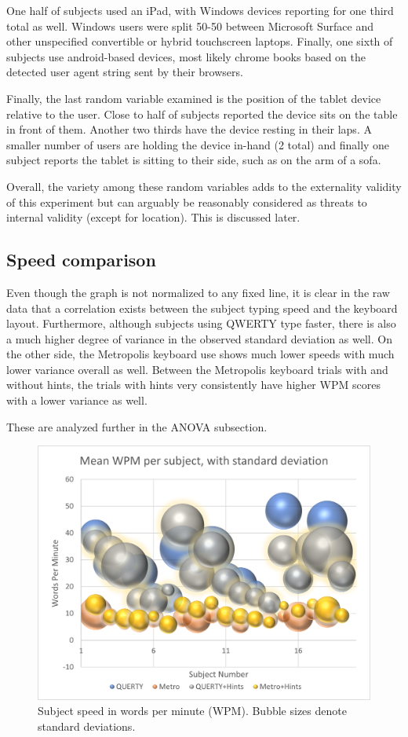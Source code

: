 \documentclass[english]{vgtc}
\begin{document}
One half of subjects used an iPad, with Windows devices reporting for one third total as well.
Windows users were split 50-50 between Microsoft Surface and other unspecified convertible or hybrid touchscreen
laptops.  Finally, one sixth of subjects use android-based devices, most likely chrome books based on the detected
user agent string sent by their browsers.

Finally, the last random variable examined is the position of the tablet device relative to the user. Close to half
of subjects reported the device sits on the table in front of them.  Another two thirds have the device resting in
their laps.  A smaller number of users are holding the device in-hand (2 total) and finally one subject reports the
tablet is sitting to their side, such as on the arm of a sofa.

Overall, the variety among these random variables adds to the externality validity of this experiment but can arguably
be reasonably considered as threats to internal validity (except for location).  This is discussed later.

\subsection{Speed comparison}
Even though the graph is not normalized to any fixed line, it is clear in the raw data that a correlation exists
between the subject typing speed and the keyboard layout. Furthermore, although subjects using QWERTY type faster,
there is also a much higher degree of variance in the observed standard deviation as well.  On the other side, the
Metropolis keyboard use shows much lower speeds with much lower variance overall as well. Between the Metropolis keyboard
trials with and without hints, the trials with hints very consistently have higher WPM scores with a lower variance as well.

These are analyzed further in the ANOVA subsection.

\begin{figure}
  \centering
  \includegraphics[width=0.95\columnwidth]{mean-wpm.png}
  \caption{Subject speed in words per minute (WPM). Bubble sizes denote standard deviations.}
  \label{fig:wpm}
\end{figure}
\end{document}
